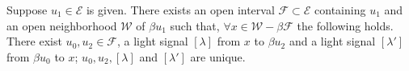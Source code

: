 Suppose $u_1 \in \mathcal{E}$ is given. There exists an open interval $\mathcal{F} \subset \mathcal{E}$ containing $u_1$ and an open neighborhood $\mathcal{W}$ of $\beta u_1$ such that, $\forall x \in \mathcal{W} - \beta \mathcal{F}$ the following holds. There exist $u_0, u_2 \in \mathcal{F}$, a light signal $[\lambda]$ from $x$ to $\beta u_2$ and a light signal $[\lambda']$ from $\beta u_0$ to $x$; $u_0, u_2, [\lambda]$ and $[\lambda']$ are unique.
